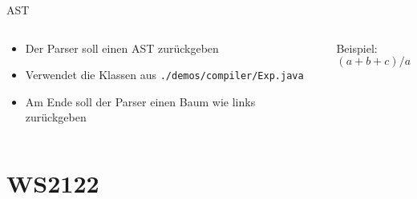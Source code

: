 \documentclass{beamer}
\begin{document}
\begin{frame}{AST}
    \begin{columns}
       \begin{column}{0.5\textwidth}
        \begin{itemize} 
            \item Der Parser soll einen AST zurückgeben
            \item Verwendet die Klassen aus \texttt{./demos/compiler/Exp.java}
            \item Am Ende soll der Parser einen Baum wie links zurückgeben
        \end{itemize}
    \end{column}
       \begin{column}{0.5\textwidth}
           Beispiel:
           $$(a+b+c)/a$$
           \begin{figure}
           \end{figure}
       \end{column}
    \end{columns}
\end{frame}

\section{WS2122}
\end{document}
